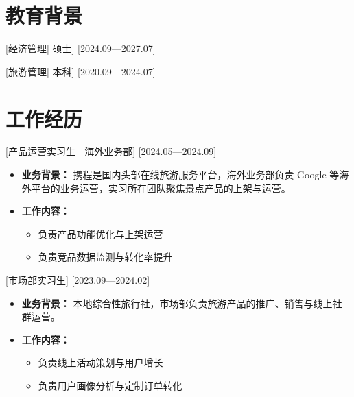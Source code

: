 \documentclass{resume}
\begin{document}

\ResumeTitle

\section{教育背景}

[\textnormal{经济管理|} 硕士]
[2024.09—2027.07]

[\textnormal{旅游管理|} 本科]
[2020.09—2024.07]

\section{工作经历}

[\textnormal{产品运营实习生 |} 海外业务部]
[2024.05—2024.09]

\begin{itemize}

\item \textbf{业务背景：} 携程是国内头部在线旅游服务平台，海外业务部负责 Google 等海外平台的业务运营，实习所在团队聚焦景点产品的上架与运营。

\item \textbf{工作内容：}
\begin{itemize}
  \item 负责产品功能优化与上架运营
  \item 负责竞品数据监测与转化率提升
\end{itemize}

\end{itemize}

[\textnormal{市场部实习生}]
[2023.09—2024.02]

\begin{itemize}

\item \textbf{业务背景：} 本地综合性旅行社，市场部负责旅游产品的推广、销售与线上社群运营。

\item \textbf{工作内容：}
\begin{itemize}
  \item 负责线上活动策划与用户增长
  \item 负责用户画像分析与定制订单转化
\end{itemize}

\end{itemize}
\end{document}
